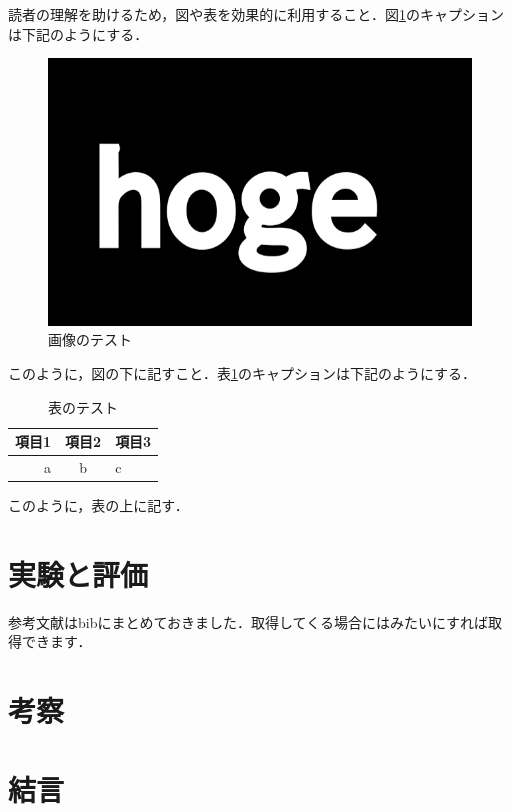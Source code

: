 \documentclass[11pt, a4paper]{jarticle}
\begin{document}
読者の理解を助けるため，図や表を効果的に利用すること．図\ref{fig1}のキャプションは下記のようにする．

\begin{figure}[H]%
  \includegraphics[scale=0.5]{hoge.png}
  \caption{画像のテスト}
  \label{fig1}%
\end{figure}

このように，図の下に記すこと．表\ref{tab1}のキャプションは下記のようにする．

\begin{table}[H]
  \caption{表のテスト}
  \begin{center}
  \begin{tabular}{ r  c  p{} } %
    \hline
    項目1 & 項目2 & 項目3 \\
    \hline
    a & b & c \\
    \hline
  \end{tabular}%
  \end{center}
  \label{tab1}
\end{table}

このように，表の上に記す．

\section{実験と評価}
参考文献はbibにまとめておきました．取得してくる場合には\cite{marumaru}\cite{abc}\cite{batubatu}\cite{efghij}みたいにすれば取得できます．

\section{考察}

\section{結言}

\end{document}
